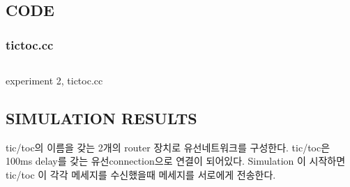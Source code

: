 \section{}
\vspace{-2mm}
    \subsection{CODE}
    \vspace{-2mm}
        \subsubsection{tictoc.cc}
        \label{sec: tictoc.cc code}
            \vspace{-2mm}
            \begin{listing}[h!]
            \inputminted[framerule = 1pt,framesep = 2mm , frame = lines, fontsize=\footnotesize]{c}{./code/week10/Experiment02/tictoc.cpp}
            \vspace{-3mm}
            \caption{\footnotesize experiment 2, tictoc.cc}
            \end{listing}
            \vspace{-6mm}
    \subsection{SIMULATION RESULTS}
    \vspace{-1mm}
    tic/toc의 이름을 갖는 2개의 router 장치로 유선네트워크를 구성한다. tic/toc은 100ms delay를 갖는 유선connection으로 연결이 되어있다.
    Simulation 이 시작하면 tic/toc 이 각각 메세지를 수신했을때 메세지를 서로에게 전송한다.  
    \vspace{-3mm}
